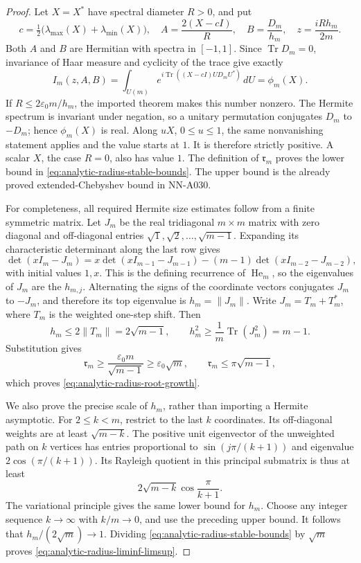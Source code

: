 \begin{proof}
Let $X=X^*$ have spectral diameter $R>0$, and put
\[
 c=\tfrac12\bigl(\lambda_{\max}(X)+\lambda_{\min}(X)\bigr),
 \quad A=\frac{2(X-cI)}R,\quad B=\frac{D_m}{h_m},
 \quad z=\frac{iRh_m}{2m}.
\]
Both $A$ and $B$ are Hermitian with spectra in $[-1,1]$.
Since $\operatorname{Tr}D_m=0$, invariance of Haar measure and
cyclicity of the trace give exactly
\[
 I_m(z,A,B)
   =\int_{U(m)}e^{i\operatorname{Tr}((X-cI)UD_mU^*)}\,dU
   =\phi_m(X).
\]
If $R\le2\varepsilon_0m/h_m$, the imported theorem makes this
number nonzero. The Hermite spectrum is invariant under negation,
so a unitary permutation conjugates $D_m$ to $-D_m$; hence
$\phi_m(X)$ is real. Along $uX$, $0\le u\le1$, the same
nonvanishing statement applies and the value starts at $1$.
It is therefore strictly positive. A scalar $X$, the case $R=0$,
also has value $1$. The definition of $\mathfrak r_m$ proves the
lower bound in \eqref{eq:analytic-radius-stable-bounds}. The upper
bound is the already proved extended-Chebyshev bound in NN-A030.

For completeness, all required Hermite size estimates follow
from a finite symmetric matrix. Let $J_m$ be the real tridiagonal
$m\times m$ matrix with zero diagonal and off-diagonal entries
$\sqrt1,\sqrt2,\ldots,\sqrt{m-1}$. Expanding its characteristic
determinant along the last row gives
\[
 \det(xI_m-J_m)=x\det(xI_{m-1}-J_{m-1})
                  -(m-1)\det(xI_{m-2}-J_{m-2}),
\]
with initial values $1,x$. This is the defining recurrence of
$\operatorname{He}_m$, so the eigenvalues of $J_m$ are the
$h_{m,j}$. Alternating the signs of the coordinate vectors
conjugates $J_m$ to $-J_m$, and therefore its top eigenvalue is
$h_m=\|J_m\|$. Write $J_m=T_m+T_m^*$, where $T_m$ is the
weighted one-step shift. Then
\[
 h_m\le2\|T_m\|=2\sqrt{m-1},\qquad
 h_m^2\ge\frac1m\operatorname{Tr}(J_m^2)=m-1.
\]
Substitution gives
\[
 \mathfrak r_m\ge\frac{\varepsilon_0m}{\sqrt{m-1}}
                      \ge\varepsilon_0\sqrt m,
 \qquad
 \mathfrak r_m\le\pi\sqrt{m-1},
\]
which proves \eqref{eq:analytic-radius-root-growth}.

We also prove the precise scale of $h_m$, rather than importing
a Hermite asymptotic. For $2\le k<m$, restrict to the last $k$
coordinates. Its off-diagonal weights are at least $\sqrt{m-k}$.
The positive unit eigenvector of the unweighted path on $k$
vertices has entries proportional to $\sin(j\pi/(k+1))$ and
eigenvalue $2\cos(\pi/(k+1))$. Its Rayleigh quotient in this
principal submatrix is thus at least
\[
                  2\sqrt{m-k}\cos\frac\pi{k+1}.
\]
The variational principle gives the same lower bound for $h_m$.
Choose any integer sequence $k\to\infty$ with $k/m\to0$,
and use the preceding upper bound. It follows that
$h_m/(2\sqrt m)\to1$. Dividing
\eqref{eq:analytic-radius-stable-bounds} by $\sqrt m$ proves
\eqref{eq:analytic-radius-liminf-limsup}.
\end{proof}

